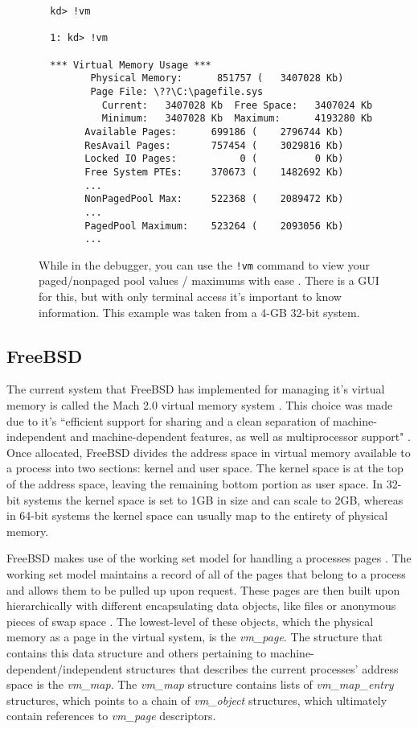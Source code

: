 \documentclass[10pt,draftclsnofoot,onecolumn]{IEEEtran}
\begin{document}
\begin{figure}[h]
\begin{lstlisting}
  kd> !vm

  1: kd> !vm

  *** Virtual Memory Usage ***
         Physical Memory:      851757 (   3407028 Kb)
         Page File: \??\C:\pagefile.sys
           Current:   3407028 Kb  Free Space:   3407024 Kb
           Minimum:   3407028 Kb  Maximum:      4193280 Kb
        Available Pages:      699186 (    2796744 Kb)
        ResAvail Pages:       757454 (    3029816 Kb)
        Locked IO Pages:           0 (          0 Kb)
        Free System PTEs:     370673 (    1482692 Kb)
        ...
        NonPagedPool Max:     522368 (    2089472 Kb)
        ...
        PagedPool Maximum:    523264 (    2093056 Kb)
        ...
\end{lstlisting}
\centering
\captionsetup{justification=centering}
\caption{
  While in the debugger, you can use the \texttt{!vm} command to view your paged/nonpaged pool values / maximums with ease \cite{win:2}.
  There is a GUI for this, but with only terminal access it's important to know information.
  This example was taken from a 4-GB 32-bit system.
}
\label{code:determining_pool_sizes}
\end{figure}

\subsection{FreeBSD}
\label{sub:Memory Management FreeBSD}
\par The current system that FreeBSD has implemented for managing it's virtual memory is called the Mach 2.0 virtual memory system \cite{bsd:1}.
This choice was made due to it's ``efficient support for sharing and a clean separation of machine-independent and machine-dependent features, as well as multiprocessor support" \cite{bsd:1}.
Once allocated, FreeBSD divides the address space in virtual memory available to a process into two sections: kernel and user space.
The kernel space is at the top of the address space, leaving the remaining bottom portion as user space.
In 32-bit systems the kernel space is set to 1GB in size and can scale to 2GB, whereas in 64-bit systems the kernel space can usually map to the entirety of physical memory.

\par FreeBSD makes use of the working set model for handling a processes pages \cite{bsd:1}.
The working set model maintains a record of all of the pages that belong to a process and allows them to be pulled up upon request.
These pages are then built upon hierarchically with different encapsulating data objects, like files or anonymous pieces of swap space \cite{bsd:1}.
The lowest-level of these objects, which the physical memory as a page in the virtual system, is the \textit{vm\_page}.
The structure that contains this data structure and others pertaining to machine-dependent/independent structures that describes the current processes' address space is the \textit{vm\_map}.
The \textit{vm\_map} structure contains lists of \textit{vm\_map\_entry} structures, which points to a chain of \textit{vm\_object} structures, which ultimately contain references to \textit{vm\_page} descriptors.
\end{document}
